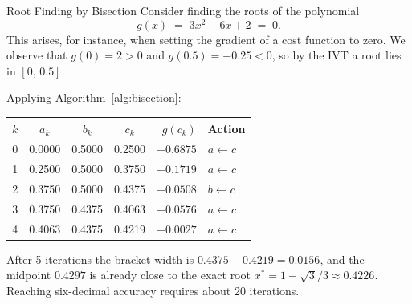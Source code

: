 \begin{center}
\label{fig:num_bisection}
\end{center}

\begin{examplebox}{Root Finding by Bisection}
	Consider finding the roots of the polynomial
	\[
	g(x) \;=\; 3x^2 - 6x + 2 \;=\; 0.
	\]
	This arises, for instance, when setting the gradient of a cost function to zero.
	We observe that $g(0)=2>0$ and $g(0.5)=-0.25<0$, so by the IVT a root lies in $[0,\,0.5]$.

	\solution

	Applying Algorithm~\ref{alg:bisection}:

	\begin{center}
	\renewcommand{\arraystretch}{1.15}
	\begin{tabular}{c c c c r l}
		\toprule
		$k$ & $a_k$ & $b_k$ & $c_k$ & $g(c_k)$ & Action \\
		\midrule
		0 & 0.0000 & 0.5000 & 0.2500 & $+0.6875$ & $a \gets c$ \\
		1 & 0.2500 & 0.5000 & 0.3750 & $+0.1719$ & $a \gets c$ \\
		2 & 0.3750 & 0.5000 & 0.4375 & $-0.0508$ & $b \gets c$ \\
		3 & 0.3750 & 0.4375 & 0.4063 & $+0.0576$ & $a \gets c$ \\
		4 & 0.4063 & 0.4375 & 0.4219 & $+0.0027$ & $a \gets c$ \\
		\bottomrule
	\end{tabular}
	\end{center}

	After 5 iterations the bracket width is $0.4375-0.4219=0.0156$, and the midpoint $0.4297$ is already close to the exact root $x^*=1-\sqrt{3}/3\approx 0.4226$. Reaching six-decimal accuracy requires about 20 iterations.
\end{examplebox}

